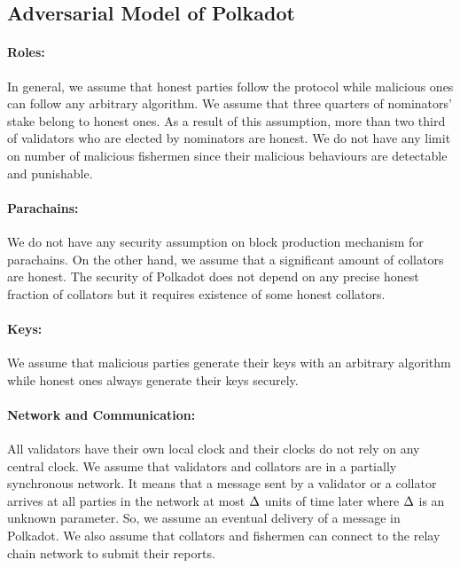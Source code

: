 \subsection{Adversarial Model of Polkadot}\label{sec:security_model}

\paragraph{Roles:} In general, we assume that honest parties follow the protocol while malicious ones can follow any arbitrary algorithm. We assume that three quarters of nominators' stake belong to honest ones. As a result of this assumption, more than two third of validators who are elected by nominators are honest. We do not have any limit on number of malicious fishermen since their malicious behaviours are detectable and punishable.

\paragraph{Parachains:} We do not have any security assumption on block production mechanism for parachains. On the other hand, we assume that a significant amount of collators are honest. The security of Polkadot does not depend on any precise honest fraction of collators but it requires existence of some honest collators.

\paragraph{Keys:} We assume that malicious parties generate their keys with an arbitrary algorithm
while honest ones always generate their keys securely.

\paragraph{Network and Communication:} \label{par:network_coms} All validators have their own local clock and their clocks do not rely on any central clock.
We assume that  validators and collators are in a partially synchronous network.
It means that a message sent by a validator or a collator arrives at all parties in the network
at most $\Delta$ units of time later where $\Delta$ is an unknown parameter. So, we assume an eventual delivery of a message in Polkadot.
We also assume that collators and fishermen can connect to the relay chain network to submit their reports.


